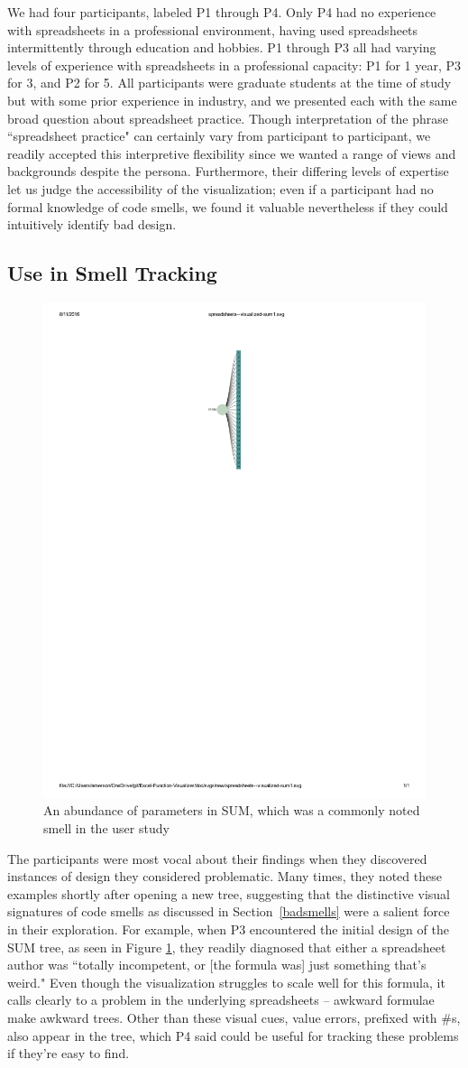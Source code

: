 \documentclass[conference]{IEEEtran}
\begin{document}
	We had four participants, labeled P1 through P4. Only P4 had no experience with
	spreadsheets in a professional environment, having used spreadsheets
	intermittently through education and hobbies. P1 through P3 all had varying
	levels of experience with spreadsheets in a professional capacity: P1 for 1
	year, P3 for 3, and P2 for 5. All participants were graduate students at the
	time of study but with some prior experience in industry, and we presented each
	with the same broad question about spreadsheet practice. Though interpretation
	of the phrase ``spreadsheet practice" can certainly vary from participant to
	participant, we readily accepted this interpretive flexibility since we wanted
	a range of views and backgrounds despite the persona. Furthermore, their
	differing levels of expertise let us judge the accessibility of the
	visualization; even if a participant had no formal knowledge of code smells, we
	found it valuable nevertheless if they could intuitively identify bad design.
	
	\subsection{Use in Smell Tracking}
	
		\begin{figure} \centering
			\includegraphics[width=.20\textwidth]{SUM}  \caption{An abundance of parameters
				in SUM, which was a commonly noted smell in the user study} \label{fig:sum}
		\end{figure}

	The participants were most vocal about their findings when they discovered
	instances of design they considered problematic. Many times, they noted these
	examples shortly after opening a new tree, suggesting that the distinctive
	visual signatures of code smells as discussed in Section~\ref{badsmells} were a salient force
	in their exploration. For example, when P3 encountered the
	initial design of the SUM tree, as seen in Figure \ref{fig:sum}, they readily
	diagnosed that either a spreadsheet author was ``totally incompetent, or [the
	formula was] just something that's weird." Even though the visualization
	struggles to scale well for this formula, it calls clearly to a problem in the
	underlying spreadsheets -- awkward formulae make awkward trees. Other than
	these visual cues, value errors, prefixed with \#s, also appear in the tree,
	which P4 said could be useful for tracking these problems if they're easy to find.
	
\end{document}
